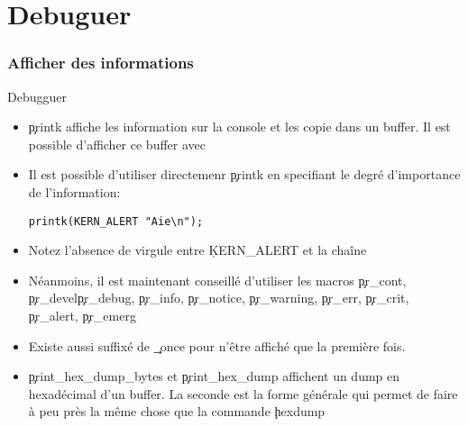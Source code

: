 %
%
%

\part{Debuguer}

\begin{frame}
  \partpage
\end{frame}

\begin{frame}
  \tableofcontents[currentpart]
\end{frame}

\section{Afficher des informations}
\begin{frame}[fragile=singleslide]{Debugguer}
  \begin{itemize} 
  \item \c{printk} affiche les information sur la console et les copie
    dans  un  buffer.  Il  est  possible  d'afficher  ce  buffer  avec
  \item   Il  est  possible   d'utiliser  directemenr   \c{printk}  en
    specifiant le degré d'importance de l'information:
    \begin{lstlisting} 
printk(KERN_ALERT "Aie\n");
    \end{lstlisting} 
  \item Notez l'absence de virgule entre \c{KERN_ALERT} et la chaîne
  \item Néanmoins,  il est maintenant conseillé  d'utiliser les macros
    \c{pr_cont}, \c{pr_devel}\c{pr_debug}, \c{pr_info}, \c{pr_notice},
    \c{pr_warning},     \c{pr_err},     \c{pr_crit},     \c{pr_alert},
    \c{pr_emerg}
  \item Existe aussi  suffixé de \c{_once} pour n'être  affiché que la
    première fois.
  \item  \c{print_hex_dump_bytes} et  \c{print_hex_dump}  affichent un
    dump en hexadécimal d'un buffer.  La seconde est la forme générale
    qui  permet de  faire à  peu près  la même  chose que  la commande
    \c{hexdump}
  \end{itemize}
\end{frame}

